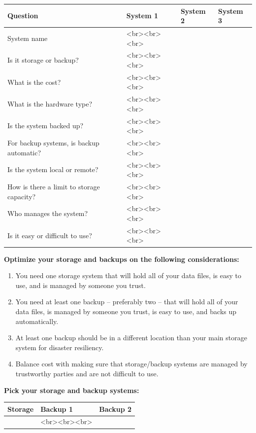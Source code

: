 \documentclass[
]{book}
\providecommand{\tightlist}{%
  \setlength{\itemsep}{0pt}\setlength{\parskip}{0pt}}
\begin{document}
\begin{tabular}{l|l|l|l}
\hline
Question & System 1 & System 2 & System 3\\
\hline
System name & <br><br><br> &  & \\
\hline
Is it storage or backup? & <br><br><br> &  & \\
\hline
What is the cost? & <br><br><br> &  & \\
\hline
What is the hardware type? & <br><br><br> &  & \\
\hline
Is the system backed up? & <br><br><br> &  & \\
\hline
For backup systems, is backup automatic? & <br><br><br> &  & \\
\hline
Is the system local or remote? & <br><br><br> &  & \\
\hline
How is there a limit to storage capacity? & <br><br><br> &  & \\
\hline
Who manages the system? & <br><br><br> &  & \\
\hline
Is it easy or difficult to use? & <br><br><br> &  & \\
\hline
\end{tabular}

\textbf{Optimize your storage and backups on the following considerations:}

\begin{enumerate}
\def\labelenumi{\arabic{enumi}.}
\tightlist
\item
  You need one storage system that will hold all of your data files, is easy to use, and is managed by someone you trust.
\item
  You need at least one backup -- preferably two -- that will hold all of your data files, is managed by someone you trust, is easy to use, and backs up automatically.
\item
  At least one backup should be in a different location than your main storage system for disaster resiliency.
\item
  Balance cost with making sure that storage/backup systems are managed by trustworthy parties and are not difficult to use.
\end{enumerate}

\textbf{Pick your storage and backup systems:}

\begin{tabular}{l|l|l}
\hline
Storage & Backup 1 & Backup 2\\
\hline
 & <br><br><br> & \\
\hline
\end{tabular}
\end{document}
